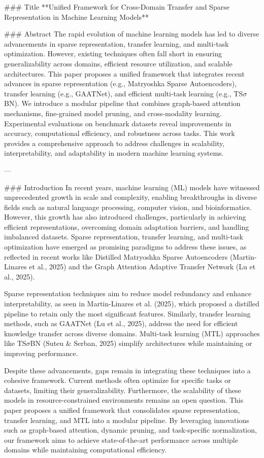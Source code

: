 ### Title
**Unified Framework for Cross-Domain Transfer and Sparse Representation in Machine Learning Models**

### Abstract
The rapid evolution of machine learning models has led to diverse advancements in sparse representation, transfer learning, and multi-task optimization. However, existing techniques often fall short in ensuring generalizability across domains, efficient resource utilization, and scalable architectures. This paper proposes a unified framework that integrates recent advances in sparse representation (e.g., Matryoshka Sparse Autoencoders), transfer learning (e.g., GAATNet), and efficient multi-task learning (e.g., TS$σ$BN). We introduce a modular pipeline that combines graph-based attention mechanisms, fine-grained model pruning, and cross-modality learning. Experimental evaluations on benchmark datasets reveal improvements in accuracy, computational efficiency, and robustness across tasks. This work provides a comprehensive approach to address challenges in scalability, interpretability, and adaptability in modern machine learning systems.

---

### Introduction
In recent years, machine learning (ML) models have witnessed unprecedented growth in scale and complexity, enabling breakthroughs in diverse fields such as natural language processing, computer vision, and bioinformatics. However, this growth has also introduced challenges, particularly in achieving efficient representations, overcoming domain adaptation barriers, and handling imbalanced datasets. Sparse representation, transfer learning, and multi-task optimization have emerged as promising paradigms to address these issues, as reflected in recent works like Distilled Matryoshka Sparse Autoencoders (Martin-Linares et al., 2025) and the Graph Attention Adaptive Transfer Network (Lu et al., 2025).

Sparse representation techniques aim to reduce model redundancy and enhance interpretability, as seen in Martin-Linares et al. (2025), which proposed a distilled pipeline to retain only the most significant features. Similarly, transfer learning methods, such as GAATNet (Lu et al., 2025), address the need for efficient knowledge transfer across diverse domains. Multi-task learning (MTL) approaches like TS$σ$BN (Suteu & Serban, 2025) simplify architectures while maintaining or improving performance.

Despite these advancements, gaps remain in integrating these techniques into a cohesive framework. Current methods often optimize for specific tasks or datasets, limiting their generalizability. Furthermore, the scalability of these models in resource-constrained environments remains an open question. This paper proposes a unified framework that consolidates sparse representation, transfer learning, and MTL into a modular pipeline. By leveraging innovations such as graph-based attention, dynamic pruning, and task-specific normalization, our framework aims to achieve state-of-the-art performance across multiple domains while maintaining computational efficiency.

